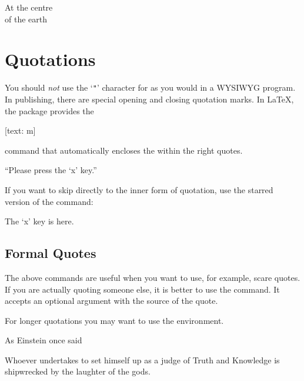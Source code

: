 \begin{example}
\begin{Center}
  At the centre\\of the earth
\end{Center}
\end{example}

\section{Quotations}\label{sec:csquotes}

You should \emph{not} use the \enquote*{\texttt{"}} character for %
 as you would in a WYSIWYG program.
In publishing, there are special opening and closing
quotation marks. In \LaTeX{}, the  package provides the
\begin{lscommand}
  [text: m]
\end{lscommand}
command that automatically encloses the  within the right
quotes.
\begin{example}
\enquote{Please press
  the \enquote{x} key.}
\end{example}

If you want to skip directly to the inner form of quotation, use the starred
version of the command:
\begin{example}
The \enquote*{x} key is here.
\end{example}

\subsection{Formal Quotes}

The above commands are useful when you want to use, for example, scare quotes.
If you are actually quoting someone else, it is better to use the
 command.
It accepts an optional argument with the source of the quote.
\begin{example}
\end{example}

For longer quotations you may want to use the  environment.
\begin{example}[examplewidth=0.5\linewidth]
As Einstein once said
\begin{displayquote}
  Whoever undertakes to
  set himself up as a judge
  of Truth and Knowledge is
  shipwrecked by the laughter
  of the gods.
\end{displayquote}
\end{example}

